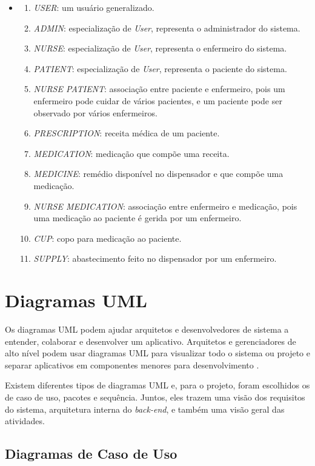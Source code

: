 \begin{itemize}
    \item[]
\begin{enumerate}
  \item \emph{USER}: um usuário generalizado.
  \item \emph{ADMIN}: especialização de \emph{User}, representa o administrador do sistema.
  \item \emph{NURSE}: especialização de \emph{User}, representa o enfermeiro do sistema.
  \item \emph{PATIENT}: especialização de \emph{User}, representa o paciente do sistema.
  \item \emph{NURSE PATIENT}: associação entre paciente e enfermeiro, pois um enfermeiro pode cuidar de vários pacientes, e um paciente pode ser observado por vários enfermeiros.
  \item \emph{PRESCRIPTION}: receita médica de um paciente.
  \item \emph{MEDICATION}: medicação que compõe uma receita.
  \item \emph{MEDICINE}: remédio disponível no dispensador e que compõe uma medicação.
  \item \emph{NURSE MEDICATION}: associação entre enfermeiro e medicação, pois uma medicação ao paciente é gerida por um enfermeiro.
  \item \emph{CUP}: copo para medicação ao paciente.
  \item \emph{SUPPLY}: abastecimento feito no dispensador por um enfermeiro.
\end{enumerate}
\end{itemize}

\section{Diagramas UML}

Os diagramas UML podem ajudar arquitetos e desenvolvedores de sistema a entender, colaborar e desenvolver um aplicativo. Arquitetos e gerenciadores de alto nível podem usar diagramas UML para visualizar todo o sistema ou projeto e separar aplicativos em componentes menores para desenvolvimento \cite{IBM}.

Existem diferentes tipos de diagramas UML e, para o projeto, foram escolhidos os de caso de uso, pacotes e sequência. Juntos, eles trazem uma visão dos requisitos do sistema, arquitetura interna do \emph{back-end}, e também uma visão geral das atividades.

\subsection{Diagramas de Caso de Uso}

